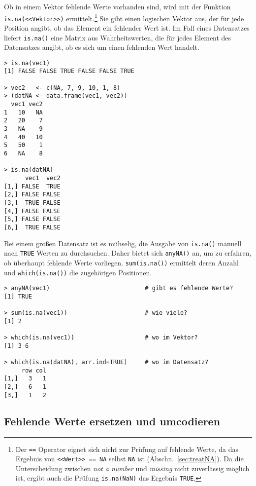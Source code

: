 Ob in einem Vektor fehlende Werte vorhanden sind, wird mit der Funktion \lstinline!is.na(<<Vektor>>)! ermittelt.\footnote{Der \lstinline!==! Operator eignet sich nicht zur Prüfung auf fehlende Werte, da das Ergebnis von \lstinline!<<Wert>> == NA! selbst \lstinline!NA! ist (Abschn.\ \ref{sec:treatNA}). Da die Unterscheidung zwischen \emph{not a number} und \emph{missing} nicht zuverlässig möglich ist, ergibt auch die Prüfung \lstinline!is.na(NaN)! das Ergebnis \lstinline!TRUE!.} Sie gibt einen logischen Vektor aus, der für jede Position angibt, ob das Element ein fehlender Wert ist. Im Fall eines Datensatzes liefert \lstinline!is.na()! eine Matrix aus Wahrheitswerten, die für jedes Element des Datensatzes angibt, ob es sich um einen fehlenden Wert handelt.
\begin{lstlisting}
> is.na(vec1)
[1] FALSE FALSE TRUE FALSE FALSE TRUE

> vec2   <- c(NA, 7, 9, 10, 1, 8)
> (datNA <- data.frame(vec1, vec2))
  vec1 vec2
1   10   NA
2   20    7
3   NA    9
4   40   10
5   50    1
6   NA    8

> is.na(datNA)
      vec1  vec2
[1,] FALSE  TRUE
[2,] FALSE FALSE
[3,]  TRUE FALSE
[4,] FALSE FALSE
[5,] FALSE FALSE
[6,]  TRUE FALSE
\end{lstlisting}

Bei einem großen Datensatz ist es mühselig, die Ausgabe von \lstinline!is.na()! manuell nach \lstinline!TRUE! Werten zu durchsuchen. Daher bietet sich \lstinline!anyNA()! an, um zu erfahren, ob überhaupt fehlende Werte vorliegen. \lstinline!sum(is.na())! ermittelt deren Anzahl und \lstinline!which(is.na())! die zugehörigen Positionen.
\begin{lstlisting}
> anyNA(vec1)                           # gibt es fehlende Werte?
[1] TRUE

> sum(is.na(vec1))                      # wie viele?
[1] 2

> which(is.na(vec1))                    # wo im Vektor?
[1] 3 6

> which(is.na(datNA), arr.ind=TRUE)     # wo im Datensatz?
     row col
[1,]   3   1
[2,]   6   1
[3,]   1   2
\end{lstlisting}

\subsection{Fehlende Werte ersetzen und umcodieren}

